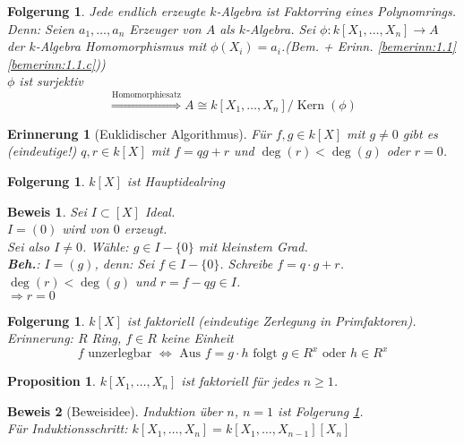\documentclass[a4paper,12pt]{report}
\theoremstyle{break}
\newtheorem{Erinn}[Def]{Erinnerung}
\newtheorem{Prop}[Def]{Proposition}
\newtheorem{Folg}[Def]{Folgerung}
\theoremstyle{nonumberbreak}
\newtheorem{Bew}{Beweis}
\theoremstyle{nonumberplain}
\DeclareMathOperator{\Kern}{Kern}
\begin{document}
\begin{Folg}\label{folg1.2}
Jede endlich erzeugte $k$-Algebra ist Faktorring eines Polynomrings.\\
	\emph{Denn:} Seien $a_1,\dots, a_n$ Erzeuger von $A$ als $k$-Algebra. Sei $\phi:k[X_1,\dots,X_n] \to A$ \emph{der} $k$-Algebra Homomorphismus mit $\phi(X_i) = a_i$.(Bem. + Erinn. \ref{bemerinn:1.1} \ref{bemerinn:1.1.c}))\\
	$\phi$ ist surjektiv \[\overset{\textrm{Homomorphiesatz}}{\Longrightarrow} A \cong k[X_1,\dots, X_n]/\Kern(\phi)\]
\end{Folg}

\begin{Erinn}[Euklidischer Algorithmus]
F\"ur $f,g\in k[X]$ mit $g\not= 0$ gibt es (eindeutige!) $q,r \in k[X]$ mit $f=qg+r$ und $\deg(r) < \deg(g)$ oder $r=0$.
\end{Erinn}

\begin{Folg}
$k[X]$ ist Hauptidealring
\end{Folg}

\begin{Bew}
Sei $I \subset[X]$ Ideal.\\
$I = (0)$ wird von $0$ erzeugt.\\
Sei also $I\not=0$. W\"ahle: $g \in I-\{0\}$ mit kleinstem Grad.\\
\textbf{Beh.}: $I = (g)$, \emph{denn:} Sei $f\in I-\{0\}$. Schreibe $f=q\cdot g+r$. $\deg(r)<\deg(g)$ und $r=f-qg \in I$.\\
$\Rightarrow r=0$
\end{Bew}

\begin{Folg}\label{folg:1.5}
$k[X]$ ist faktoriell (eindeutige Zerlegung in Primfaktoren).\\
\emph{Erinnerung}: $R$ Ring, $f \in R$ keine Einheit\\
	\[f \textrm{ unzerlegbar } \Leftrightarrow \textrm{ Aus } f = g\cdot h \textrm{ folgt } g \in R^x \textrm{ oder } h\in R^x\]
\end{Folg}

\begin{Prop}
$k[X_1, \dots, X_n]$ ist faktoriell f\"ur jedes $n\ge 1$.\\
\end{Prop}

\begin{Bew}[Beweisidee]
Induktion \"uber $n$, $n = 1$ ist Folgerung \ref{folg:1.5}.\\
F\"ur Induktionsschritt: $k[X_1,\dots, X_n] = k[X_1,\dots,X_{n-1}][X_n]$
\end{Bew}
\end{document}
